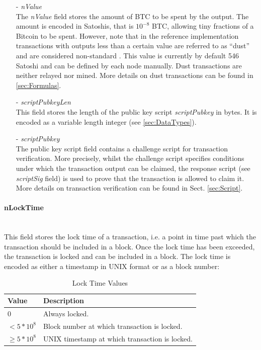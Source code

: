 \begin{itemize}
\item[-] \textit{nValue}~\\
The \textit{nValue} field stores the amount of BTC to be spent by the output. The amount is encoded in Satoshis, that is $10^{-8}$ BTC, allowing tiny fractions of a Bitcoin to be spent. However, note that in the reference implementation transactions with outputs less than a certain value are referred to as ``dust'' and are considered non-standard \cite{DustTransactions}. This value is currently by default 546 Satoshi and can be defined by each node manually. Dust transactions are neither relayed nor mined. More details on dust transactions can be found in \ref{sec:Formulas}.

\item[-] \textit{scriptPubkeyLen}~\\
This field stores the length of the public key script \textit{scriptPubkey} in bytes. It is encoded as a variable length integer (see \ref{sec:DataTypes}).

\item[-] \textit{scriptPubkey}~\\
The public key script field contains a challenge script for transaction verification. More precisely, whilst the challenge script specifies conditions under which the transaction output can be claimed, the response script (see \textit{scriptSig} field) is used to prove that the transaction is allowed to claim it. More details on transaction verification can be found in Sect. \ref{sec:Script}.

\end{itemize}

\paragraph{nLockTime}~\\
This field stores the lock time of a transaction, i.e. a point in time past which the transaction should be included in a block. Once the lock time has been exceeded, the transaction is locked and can be included in a block. The lock time is encoded as either a timestamp in UNIX format or as a block number:

\begin{table}
\centering
	\begin{tabular}{| >{\centering} m{40pt} | m{200pt} |}
	
	\hline
	\textbf{Value} &
	\textbf{Description} \\ \hline\hline
	
	$0$ & Always locked. \\ \hline \rule{0pt}{10pt}
	$< 5*10^{8}$ & Block number at which transaction is locked. \\ \hline \rule{0pt}{10pt}
	$\geq 5*10^{8}$ & UNIX timestamp at which transaction is locked. \\ \hline
	\end{tabular}
	
	\vspace{5pt}
	\caption{Lock Time Values}
	\label{tab:LockTime}
\end{table}
\vspace{-15pt}

